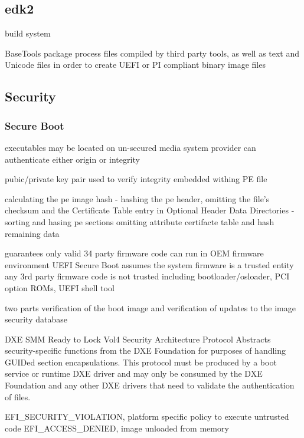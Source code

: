 \subsection{edk2}
build system

BaseTools package process files compiled by third party tools, as well as text and Unicode files in order to create UEFI or PI compliant binary image files
\cite{tianocore-edk2}

\subsection{Security}

\subsubsection{Secure Boot}
executables may be located on un-secured media
system provider can authenticate either origin or integrity

pubic/private key pair used to verify integrity
embedded withing PE file

calculating the pe image hash
- hashing the pe header, omitting the file's checksum and the Certificate Table entry in Optional Header Data Directories
- sorting and hasing pe sections
omitting attribute certifacte table and hash remaining data

\cite{microsoft-pe-signature-format}

guarantees only valid 34 party firmware code can run in OEM firmware environment
UEFI Secure Boot assumes the system firmware is a trusted entity
any 3rd party firmware code is not trusted
including bootloader/osloader, PCI option ROMs, UEFI shell tool

two parts
verification of the boot image and verification of updates to the image security database
\cite{understanding-uefi-secure-boot-chain}

DXE SMM Ready to Lock Vol4
Security Architecture Protocol
Abstracts security-specific functions from the DXE Foundation for purposes of handling GUIDed
section encapsulations. This protocol must be produced by a boot service or runtime DXE driver
and may only be consumed by the DXE Foundation and any other DXE drivers that need to validate
the authentication of files.

EFI_SECURITY_VIOLATION, platform specific policy to execute untrusted code
EFI_ACCESS_DENIED, image unloaded from memory

